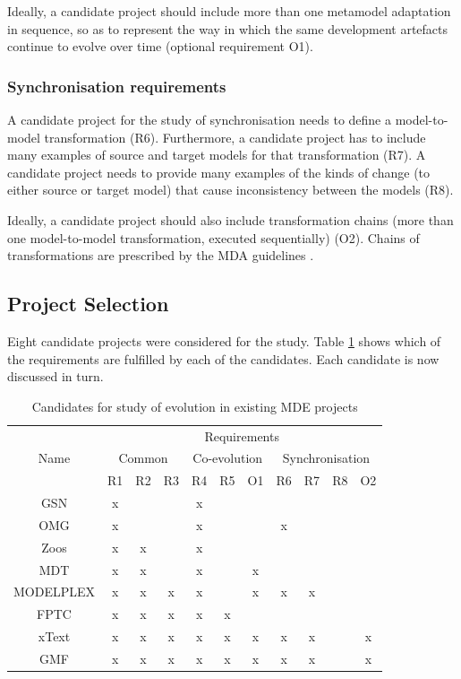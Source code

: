 Ideally, a candidate project should include more than one metamodel adaptation in sequence, so as to represent the way in which the same development artefacts continue to evolve over time (optional requirement O1).

\subsubsection{Synchronisation requirements}
A candidate project for the study of synchronisation needs to define a model-to-model transformation (R6). Furthermore, a candidate project has to include many examples of source and target models for that transformation (R7). A candidate project needs to provide many examples of the kinds of change (to either source or target model) that cause inconsistency between the models (R8). 

Ideally, a candidate project should also include transformation chains (more than one model-to-model transformation, executed sequentially) (O2). Chains of transformations are prescribed by the MDA guidelines \cite{kleppe03mda}.


\subsection{Project Selection}
\label{subsec:project_selection}
Eight candidate projects were considered for the study. Table \ref{tab:candidates} shows which of the requirements are fulfilled by each of the candidates. Each candidate is now discussed in turn.

\begin{table}
	\centering
	\begin{tabular}{|c||c|c|c||c|c|c||c|c|c|c|}
		\hline
		\multirow{3}{*}{Name} & \multicolumn{10}{|c|}{Requirements} \\
		\cline{2-11}
		          & \multicolumn{3}{|c||}{Common} & \multicolumn{3}{|c||}{Co-evolution} & \multicolumn{4}{|c|}{Synchronisation} \\
		\cline{2-11}
		          & R1 & R2 & R3 & R4 & R5 & O1 & R6 & R7 & R8 & O2 \\
		\hline
		GSN       & x  &    &    & x  &    &    &    &    &    &    \\
		\hline
		OMG       & x  &    &    & x  &    &    & x  &    &    &    \\
		\hline
		Zoos      & x  & x  &    & x  &    &    &    &    &    &    \\
		\hline
		MDT       & x  & x  &    & x  &    & x  &    &    &    &    \\
		\hline
		MODELPLEX & x  & x  & x  & x  &    & x  & x  & x  &    &    \\
		\hline
		FPTC      & x  & x  & x  & x  & x  &    &    &    &    &    \\
		\hline
		xText     & x  & x  & x  & x  & x  & x  & x  & x  &    & x  \\
		\hline
		GMF       & x  & x  & x  & x  & x  & x  & x  & x  &    & x  \\
		\hline
	\end{tabular}
	\label{tab:candidates}
	\caption{Candidates for study of evolution in existing MDE projects}
\end{table}

